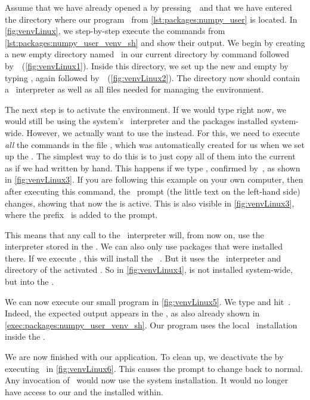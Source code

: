 Assume that we have already opened a  by pressing~\ubuntuTerminal\ and that we have entered the directory where our program~ from \cref{lst:packages:numpy_user} is located.
In \cref{fig:venvLinux}, we step-by-step execute the commands from \cref{lst:packages:numpy_user_venv_sh} and show their output.
We begin by creating a new empty directory named~ in our current directory by  command followed by~\keys{\return}~(\cref{fig:venvLinux1}).
Inside this directory, we set up the new and empty  by typing , again followed by~\keys{\return}~(\cref{fig:venvLinux2}).
The directory  now should contain a \python\ interpreter as well as all files needed for managing the environment.

The next step is to activate the environment.
If we would type  right now, we would still be using the system's \python\ interpreter and the packages installed system-wide.
However, we actually want to use the  instead.
For this, we need to execute \emph{all} the commands in the file , which was automatically created for us when we set up the .
The simplest way to do this is to just copy all of them into the current  as if we had written by hand.
This happens if we type , confirmed by~\keys{\return}, as shown in \cref{fig:venvLinux3}.
If you are following this example on your own computer, then after executing this command, the \bash\ prompt (the little text on the left-hand side) changes, showing that now the  is active.
This is also visible in \cref{fig:venvLinux3}, where the prefix~ is added to the prompt.

This means that any call to the \python\ interpreter will, from now on, use the interpreter stored in the .
We can also only use packages that were installed there.
If we execute , this will install the \numpy\ .
But it uses the \python\ interpreter and  directory of the activated .
So in \cref{fig:venvLinux4}, \numpy{} is not installed system-wide, but into the .%
%
\begin{sloppypar}%
We can now execute our small program  in \cref{fig:venvLinux5}.
We type  and hit~\keys{\return}.
Indeed, the expected output  appears in the , as also already shown in \cref{exec:packages:numpy_user_venv_sh}.
Our program uses the local \numpy\ installation inside the .%
\end{sloppypar}%
%
We are now finished with our application.
To clean up, we deactivate the  by executing~ in \cref{fig:venvLinux6}.
This causes the prompt to change back to normal.
Any invocation of \python\ would now use the system installation.
It would no longer have access to our  and the  installed within.

